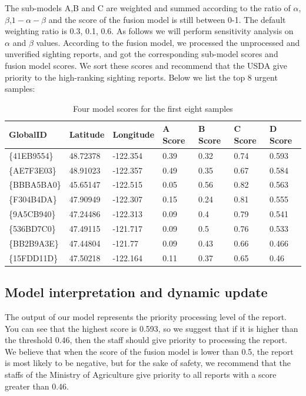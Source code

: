 \documentclass{mcmthesis}
\numberwithin{figure}{section}
\numberwithin{table}{section}
\begin{document}
The sub-models A,B and C are weighted and summed according to the ratio of $\alpha$,$\beta$,$1-\alpha-\beta$ and the score of the fusion model is still between 0-1. The default weighting ratio is 0.3, 0.1, 0.6. As follows we will perform sensitivity analysis on  $\alpha$ and $\beta$ values. According to the fusion model, we processed the unprocessed and unverified sighting reports, and got the corresponding sub-model scores and fusion model scores. We sort these scores and recommend that the USDA give priority to the high-ranking sighting reports. Below we list the top 8 urgent samples:

\begin{table}[]
  \centering
  
  \begin{tabular}{lllllll}
  \hline
  GlobalID                                 & Latitude & Longitude & A Score & B Score & C Score & D Score \\ \hline
  \{41EB9554\} & 48.72378 & -122.354  & 0.39    & 0.32    & 0.74    & 0.593   \\
  \{AE7F3E03\} & 48.91023 & -122.357  & 0.49    & 0.35    & 0.67    & 0.584   \\
  \{BBBA5BA0\} & 45.65147 & -122.515  & 0.05    & 0.56    & 0.82    & 0.563   \\
  \{F304B4DA\} & 47.90949 & -122.307  & 0.15    & 0.24    & 0.81    & 0.555   \\
  \{9A5CB940\} & 47.24486 & -122.313  & 0.09    & 0.4     & 0.79    & 0.541   \\
  \{536BD7C0\} & 47.49115 & -121.717  & 0.09    & 0.5     & 0.76    & 0.533   \\
  \{BB2B9A3E\} & 47.44804 & -121.77   & 0.09    & 0.43    & 0.66    & 0.466   \\
  \{15FDD11D\} & 47.50218 & -122.164  & 0.11    & 0.37    & 0.65    & 0.46    \\ \hline
  \end{tabular}
  \caption{Four model scores for the first eight samples}
  \end{table}

\subsection{Model interpretation and dynamic update}

The output of our model represents the priority processing level of the report. You can see that the highest score is 0.593, so we suggest that if it is higher than the threshold 0.46, then the staff should give priority to processing the report. We believe that when the score of the fusion model is lower than 0.5, the report is most likely to be negative, but for the sake of safety, we recommend that the staffs of the Ministry of Agriculture give priority to all reports with a score greater than 0.46.
\end{document}
